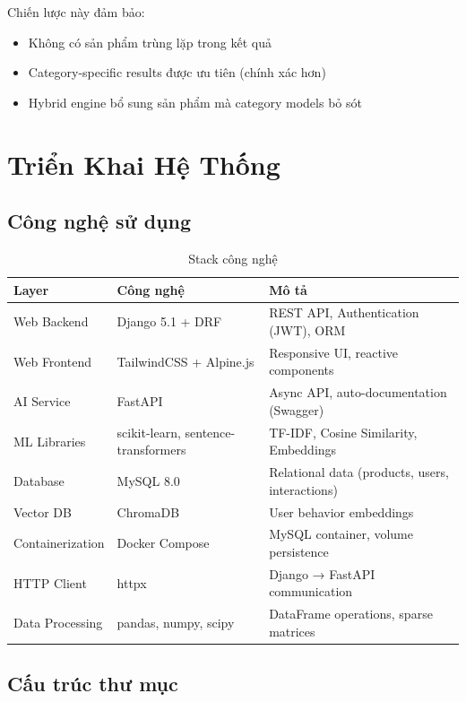 \documentclass[12pt,a4paper]{report}
\begin{document}
Chiến lược này đảm bảo:
\begin{itemize}
    \item Không có sản phẩm trùng lặp trong kết quả
    \item Category-specific results được ưu tiên (chính xác hơn)
    \item Hybrid engine bổ sung sản phẩm mà category models bỏ sót
\end{itemize}

\chapter{Triển Khai Hệ Thống}

\section{Công nghệ sử dụng}

\begin{table}[H]
\centering
\caption{Stack công nghệ}
\label{tab:tech_stack}
\begin{tabular}{llp{7cm}}
\toprule
\textbf{Layer} & \textbf{Công nghệ} & \textbf{Mô tả} \\
\midrule
Web Backend & Django 5.1 + DRF & REST API, Authentication (JWT), ORM \\
Web Frontend & TailwindCSS + Alpine.js & Responsive UI, reactive components \\
AI Service & FastAPI & Async API, auto-documentation (Swagger) \\
ML Libraries & scikit-learn, sentence-transformers & TF-IDF, Cosine Similarity, Embeddings \\
Database & MySQL 8.0 & Relational data (products, users, interactions) \\
Vector DB & ChromaDB & User behavior embeddings \\
Containerization & Docker Compose & MySQL container, volume persistence \\
HTTP Client & httpx & Django → FastAPI communication \\
Data Processing & pandas, numpy, scipy & DataFrame operations, sparse matrices \\
\bottomrule
\end{tabular}
\end{table}

\section{Cấu trúc thư mục}
\end{document}
